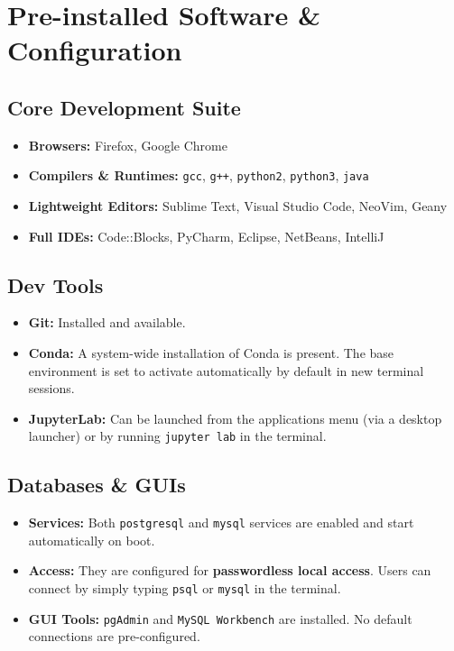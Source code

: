 \documentclass[12pt]{article}
\begin{document}
\section{Pre-installed Software \& Configuration}

\subsection{Core Development Suite}
\begin{itemize}
    \item \textbf{Browsers:} Firefox, Google Chrome
    \item \textbf{Compilers \& Runtimes:} \texttt{gcc}, \texttt{g++}, \texttt{python2}, \texttt{python3}, \texttt{java}
    \item \textbf{Lightweight Editors:} Sublime Text, Visual Studio Code, NeoVim, Geany
    \item \textbf{Full IDEs:} Code::Blocks, PyCharm, Eclipse, NetBeans, IntelliJ
\end{itemize}

\subsection{Dev Tools}
\begin{itemize}
    \item \textbf{Git:} Installed and available.
    \item \textbf{Conda:} A system-wide installation of Conda is present. The base environment is set to activate automatically by default in new terminal sessions.
    \item \textbf{JupyterLab:} Can be launched from the applications menu (via a desktop launcher) or by running \texttt{jupyter lab} in the terminal.
\end{itemize}

\subsection{Databases \& GUIs}
\begin{itemize}
    \item \textbf{Services:} Both \texttt{postgresql} and \texttt{mysql} services are enabled and start automatically on boot.
    \item \textbf{Access:} They are configured for \textbf{passwordless local access}. Users can connect by simply typing \texttt{psql} or \texttt{mysql} in the terminal.
    \item \textbf{GUI Tools:} \texttt{pgAdmin} and \texttt{MySQL Workbench} are installed. No default connections are pre-configured.
\end{itemize}
\end{document}
